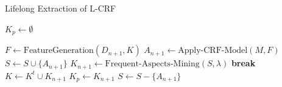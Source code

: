 \documentclass[11pt,a4paper]{article}
\makeatletter
\theoremstyle{definition}
\newcommand{\ALOOP}[1]{\ALC@it\algorithmicloop\ #1%
    \begin{ALC@loop}}
\newcommand{\ENDALOOP}{\end{ALC@loop}\ALC@it\algorithmicendloop}
\newcommand{\algorithmicbreak}{\textbf{break}}
\newcommand{\BREAK}{\STATE \algorithmicbreak}
\makeatother
\begin{document}

    
    



\begin{algorithm}
    \caption{Lifelong Extraction of L-CRF}\label{algo:pred}
    \begin{algorithmic}[1]
        \STATE $K_p \leftarrow \emptyset$
        \ALOOP{} %
        \STATE $F \leftarrow \text{FeatureGeneration}(D_{n+1}, K)$ \label{test:1}
        \STATE $A_{n+1} \leftarrow \text{Apply-CRF-Model}(M, F)$  \label{test:2}
        \STATE $S \leftarrow S \cup \{A_{n+1}\}$
        \STATE $K_{n+1} \leftarrow \text{Frequent-Aspects-Mining}(S,\lambda)$
        \BREAK
        \ELSE
        \STATE $K \leftarrow K^t \cup K_{n+1}$\label{test:3}
        \STATE $K_p \leftarrow K_{n+1}$\label{test:4}
        \STATE $S \leftarrow S - \{A_{n+1}\}$
        \ENDIF
        \ENDALOOP
    \end{algorithmic}
\end{algorithm}
\end{document}
